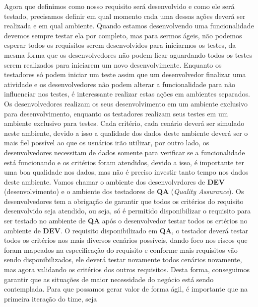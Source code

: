       Agora que definimos como nosso requisito será desenvolvido e como ele será
      testado, precisamos definir em qual momento cada uma dessas ações deverá ser
      realizada e em qual ambiente. Quando estamos desenvolvendo uma funcionalidade
      devemos sempre testar ela por completo, mas para sermos ágeis, não podemos
      esperar todos os requisitos serem desenvolvidos para iniciarmos os testes,
      da mesma forma que os desenvolvedores não podem ficar aguardando todos os
      testes serem realizados para iniciarem um novo desenvolvimente. Enquanto os
      testadores só podem iniciar um teste assim que um desenvolvedor finalizar
      uma atividade e os desenvolvedores não podem alterar a funcionalidade para não
      influenciar nos testes, é interessante realizar estas ações em ambientes
      separados. Os desenvolvedores realizam os seus desenvolvimento em um ambiente
      exclusivo para desenvolvimento, enquanto os testadores realizam seus testes
      em um ambiente exclusivo para testes. Cada critério, cada cenário deverá ser
      simulado neste ambiente, devido a isso a qualidade dos dados deste ambiente
      deverá ser o mais fiel possível ao que os usuários irão utilizar, por outro
      lado, os desenvolvedores necessitam de dados somente para verificar se a
      funcionalidade está funcionando e os critérios foram atendidos, devido a isso,
      é importante ter uma boa qualidade nos dados, mas não é preciso investir
      tanto tempo nos dados deste ambiente. Vamos chamar o ambiente dos desenvolvrdores
      de \textbf{DEV} (desenvolvimento) e o ambiente dos testadores de \textbf{QA}
      (\textit{Quality Assurance}). \newline
      Os desenvolvedores tem a obrigação de garantir que todos os critérios do
      requisito desenvolvido seja atendido, ou seja, só é permitido disponibilizar
      o requisito para ser testado no ambiente de \textbf{QA} após o desenvolvedor
      testar todos os crtérios no ambiente de \textbf{DEV}. O requisito disponibilizado
      em \textbf{QA}, o testador deverá testar todos os critérios nos mais diversos
      cenários possíveis, dando foco nos riscos que foram mapeados na especificação
      do requisito e conforme mais requisitos vão sendo disponibilizados, ele deverá
      testar novamente todos cenários novamente, mas agora validando os critérios
      dos outros requisitos. Desta forma, conseguimos garantir que as situações de
      maior necessidade do negócio está sendo contemplada. Para que possamos gerar
      valor de forma ágil, é importante que na primeira iteração do time, seja
